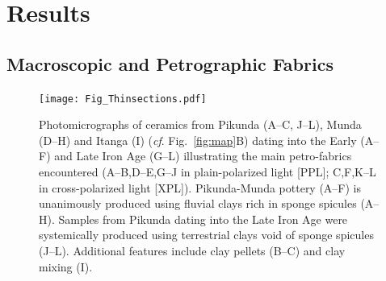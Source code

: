 \documentclass[smallextended,natbib]{svjour3}       %
\begin{document}
\section{Results}

\subsection{Macroscopic and Petrographic Fabrics}

\begin{figure}[!tb]
	\texttt{[image: Fig\_Thinsections.pdf]}
	\caption{Photomicrographs of ceramics from Pikunda (A--C, J--L), Munda (D--H) and Itanga (I) (\textit{cf}. Fig.~\ref{fig:map}B) dating into the Early (A--F) and Late Iron Age (G--L) illustrating the main petro-fabrics encountered (A--B,D--E,G--J in plain-polarized light [PPL]; C,F,K--L in cross-polarized light [XPL]). Pikunda-Munda pottery (A--F) is unanimously produced using fluvial clays rich in sponge spicules (A--H). Samples from Pikunda dating into the Late Iron Age were systemically produced using terrestrial clays void of sponge spicules (J--L). Additional features include clay pellets (B--C) and clay mixing (I).}
	\label{fig:thinsections}
\end{figure}
\end{document}
